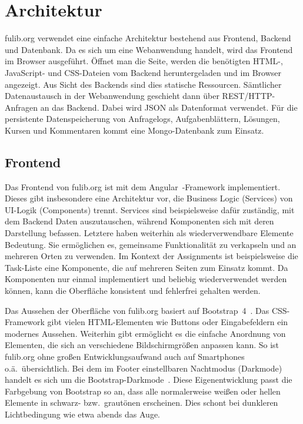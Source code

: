 \section{Architektur}\label{sec:architecture}

fulib.org verwendet eine einfache Architektur bestehend aus Frontend, Backend und Datenbank.
Da es sich um eine Webanwendung handelt, wird das Frontend im Browser ausgeführt.
Öffnet man die Seite, werden die benötigten HTML-, JavaScript- und CSS-Dateien vom Backend heruntergeladen und im Browser angezeigt.
Aus Sicht des Backends sind dies statische Ressourcen.
Sämtlicher Datenaustausch in der Webanwendung geschieht dann über REST/HTTP-Anfragen an das Backend.
Dabei wird JSON als Datenformat verwendet.
Für die persistente Datenspeicherung von Anfragelogs, Aufgabenblättern, Lösungen, Kursen und Kommentaren kommt eine Mongo-Datenbank zum Einsatz.

\subsection{Frontend}\label{subsec:frontend}

Das Frontend von fulib.org ist mit dem Angular~\cite{angular}-Framework implementiert.
Dieses gibt insbesondere eine Architektur vor, die Business Logic (Services) von UI-Logik (Components) trennt.
Services sind beispielsweise dafür zuständig, mit dem Backend Daten auszutauschen,
während Komponenten sich mit deren Darstellung befassen.
Letztere haben weiterhin als wiederverwendbare Elemente Bedeutung.
Sie ermöglichen es, gemeinsame Funktionalität zu verkapseln und an mehreren Orten zu verwenden.
Im Kontext der Assignments ist beispielsweise die Task-Liste eine Komponente, die auf mehreren Seiten zum Einsatz kommt.
Da Komponenten nur einmal implementiert und beliebig wiederverwendet werden können,
kann die Oberfläche konsistent und fehlerfrei gehalten werden.

Das Aussehen der Oberfläche von fulib.org basiert auf Bootstrap~4~\cite{bootstrap}.
Das CSS-Framework gibt vielen HTML-Elementen wie Buttons oder Eingabefeldern ein modernes Aussehen.
Weiterhin gibt ermöglicht es die einfache Anordnung von Elementen, die sich an verschiedene Bildschirmgrößen anpassen kann.
So ist fulib.org ohne großen Entwicklungsaufwand auch auf Smartphones o.ä.\ übersichtlich.
Bei dem im Footer einstellbaren Nachtmodus (Darkmode) handelt es sich um die Bootstrap-Darkmode~\cite{bootstrap-darkmode}.
Diese Eigenentwicklung passt die Farbgebung von Bootstrap so an, dass alle normalerweise weißen oder hellen Elemente in schwarz- bzw.\ grautönen erscheinen.
Dies schont bei dunkleren Lichtbedingung wie etwa abends das Auge.

